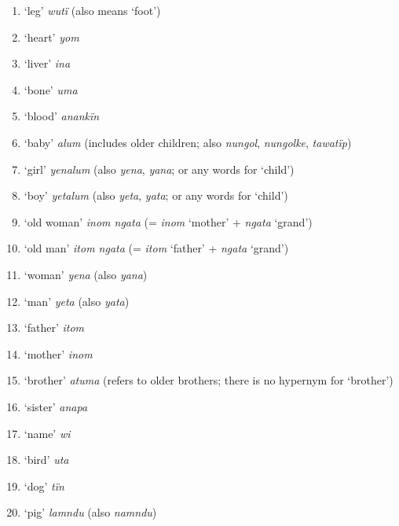 \begin{enumerate}[noitemsep, label={\arabic*}, align=left, widest=190, labelsep=1ex,leftmargin=*]
\item  ‘leg’ \textit{wutï} (also means ‘foot’)

\item  ‘heart’ \textit{yom}

\item  ‘liver’ \textit{ina}

\item  ‘bone’ \textit{uma}

\item  ‘blood’ \textit{anankïn}

\item  ‘baby’ \textit{alum} (includes older children; also \textit{nungol}, \textit{nungolke}, \textit{tawatïp})

\item  ‘girl’ \textit{yenalum} (also \textit{yena}, \textit{yana}; or any words for ‘child’)

\item  ‘boy’ \textit{yetalum} (also \textit{yeta}, \textit{yata}; or any words for ‘child’)

\item  ‘old woman’ \textit{inom ngata} (= \textit{inom} ‘mother’ + \textit{ngata} ‘grand’)

\item  ‘old man’ \textit{itom ngata} (= \textit{itom} ‘father’ + \textit{ngata} ‘grand’)

\item  ‘woman’ \textit{yena} (also \textit{yana})

\item  ‘man’ \textit{yeta} (also \textit{yata})

\item  ‘father’ \textit{itom}

\item  ‘mother’ \textit{inom}

\item  ‘brother’ \textit{atuma} (refers to older brothers; there is no hypernym for ‘brother’)

\item  ‘sister’ \textit{anapa}

\item  ‘name’ \textit{wi}

\item  ‘bird’ \textit{uta}

\item  ‘dog’ \textit{tïn}

\item  ‘pig’ \textit{lamndu} (also \textit{namndu})


\end{enumerate}
